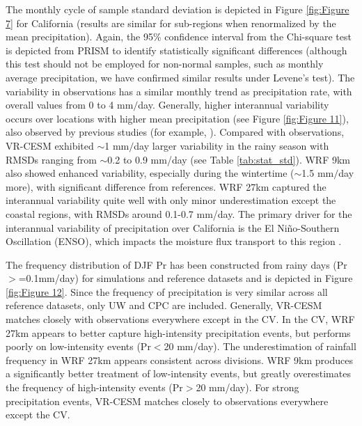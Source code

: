 The monthly cycle of sample standard deviation is depicted in Figure \ref{fig:Figure 7} for California (results are similar for sub-regions when renormalized by the mean precipitation).  Again, the 95\% confidence interval from the Chi-square test is depicted from PRISM to identify statistically significant differences (although this test should not be employed for non-normal samples, such as monthly average precipitation, we have confirmed similar results under Levene's test). The variability in observations has a similar monthly trend as precipitation rate, with overall values from 0 to 4 mm$/$day.  Generally, higher interannual variability occurs over locations with higher mean precipitation (see Figure \ref{fig:Figure 11}), also observed by previous studies (for example, \cite{duffy2006simulations}). Compared with observations, VR-CESM exhibited $\sim$1 mm$/$day larger variability in the rainy season with RMSDs ranging from $\sim$0.2 to 0.9 mm/day (see Table \ref{tab:stat_std}). WRF 9km also showed enhanced variability, especially during the wintertime ($\sim$1.5 mm$/$day more), with significant difference from references. WRF 27km captured the interannual variability quite well with only minor underestimation except the coastal regions, with RMSDs around 0.1-0.7 mm/day. The primary driver for the interannual variability of precipitation over California is the El Ni\~{n}o-Southern Oscillation (ENSO), which impacts the moisture flux transport to this region \cite{cayan1998decadal, cayan1999enso, leung2003hydroclimate2}.


The frequency distribution of DJF Pr has been constructed from rainy days (Pr$>$=0.1mm/day) for simulations and reference datasets and is depicted in Figure \ref{fig:Figure 12}.  Since the frequency of precipitation is very similar across all reference datasets, only UW and CPC are included. Generally, VR-CESM matches closely with observations everywhere except in the CV. In the CV, WRF 27km appears to better capture high-intensity precipitation events, but performs poorly on low-intensity events (Pr$<$20 mm/day). The underestimation of rainfall frequency in WRF 27km appears consistent across divisions. WRF 9km produces a significantly better treatment of low-intensity events, but greatly overestimates the frequency of high-intensity events (Pr$>$20 mm/day). For strong precipitation events, VR-CESM matches closely to observations everywhere except the CV.

